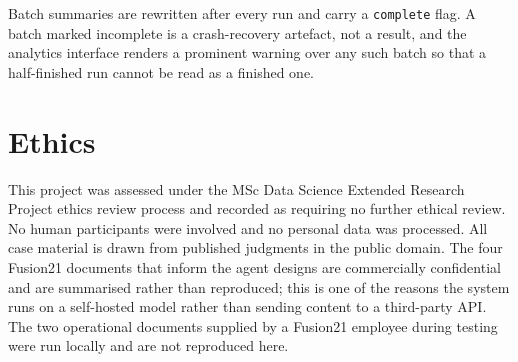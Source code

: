 Batch summaries are rewritten after every run and carry a \texttt{complete} flag.
A batch marked incomplete is a crash-recovery artefact, not a result, and the
analytics interface renders a prominent warning over any such batch so that a
half-finished run cannot be read as a finished one.

\chapter{Ethics}
\label{app:ethics}

This project was assessed under the MSc Data Science Extended Research Project
ethics review process and recorded as requiring no further ethical review. No
human participants were involved and no personal data was processed. All case
material is drawn from published judgments in the public domain. The four Fusion21
documents that inform the agent designs are commercially confidential and are
summarised rather than reproduced; this is one of the reasons the system runs on
a self-hosted model rather than sending content to a third-party API. The two
operational documents supplied by a Fusion21 employee during testing were run
locally and are not reproduced here.
